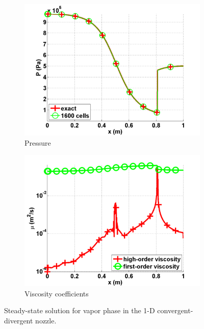 \documentclass[preprint,10pt]{elsarticle}
\begin{document}
\begin{figure}[H]
\begin{subfigure}[b]{0.495\textwidth}
                \label{fig:1d_nozzle_vap_density}
        \end{subfigure}
        \begin{subfigure}[b]{0.495\textwidth}
                \centering
                \includegraphics[width=\textwidth]{vapor_pressure_numerical_and_exact_1600.png}
                \caption{Pressure}
                \label{fig:1d_nozzle_vap_press}
        \end{subfigure}
        \begin{subfigure}[b]{0.495\textwidth}
                \centering
                \includegraphics[width=\textwidth]{vapor_viscosity_numerical1600.png}
                \caption{Viscosity coefficients}
                \label{fig:1d_nozzle_vap_visc}
        \end{subfigure}
        \caption{Steady-state solution for vapor phase in the 1-D convergent-divergent nozzle.}
				\label{fig:1d_vap_nozzle}
\end{figure}
\end{document}
